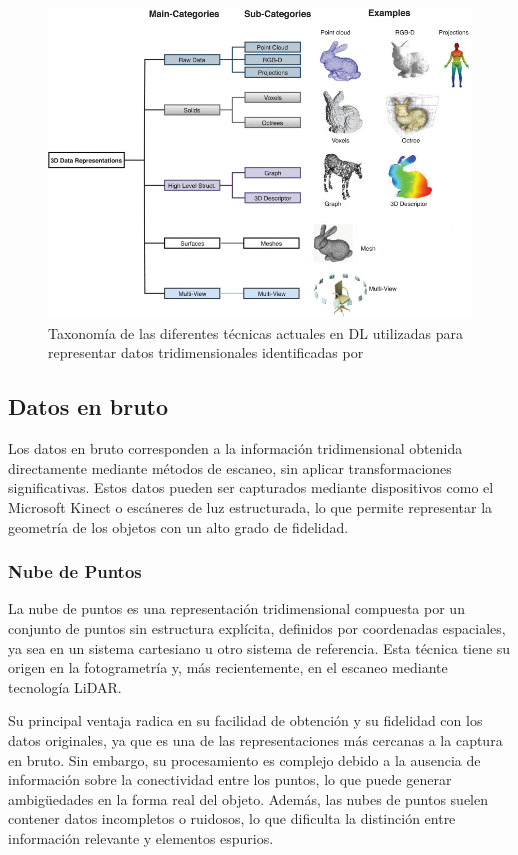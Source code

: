 \begin{figure}[h]
    \centering
    \includegraphics[width=\linewidth]{figures/2_theory/3Dtaxonomy.png}
    \caption[Taxonomía de las representaciones 3D para Deep Learning]{Taxonomía de las diferentes técnicas actuales en DL utilizadas para representar datos tridimensionales identificadas por \cite{gezawa_review_2020}}
    \label{fig:3dTaxonomy}
\end{figure}

\subsection{Datos en bruto}
Los datos en bruto corresponden a la información tridimensional obtenida directamente mediante métodos de escaneo, sin aplicar transformaciones significativas. Estos datos pueden ser capturados mediante dispositivos como el Microsoft Kinect o escáneres de luz estructurada, lo que permite representar la geometría de los objetos con un alto grado de fidelidad.

\subsubsection{Nube de Puntos}
La nube de puntos es una representación tridimensional compuesta por un conjunto de puntos sin estructura explícita, definidos por coordenadas espaciales, ya sea en un sistema cartesiano u otro sistema de referencia. Esta técnica tiene su origen en la fotogrametría y, más recientemente, en el escaneo mediante tecnología LiDAR.

Su principal ventaja radica en su facilidad de obtención y su fidelidad con los datos originales, ya que es una de las representaciones más cercanas a la captura en bruto. Sin embargo, su procesamiento es complejo debido a la ausencia de información sobre la conectividad entre los puntos, lo que puede generar ambigüedades en la forma real del objeto. Además, las nubes de puntos suelen contener datos incompletos o ruidosos, lo que dificulta la distinción entre información relevante y elementos espurios.

